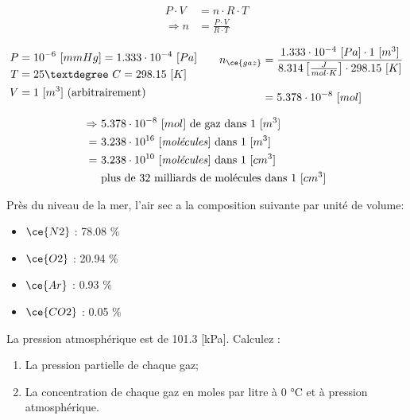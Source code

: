 \documentclass[
  11pt,
  a4paper,
  openany]{book}
\providecommand{\tightlist}{%
  \setlength{\itemsep}{0pt}\setlength{\parskip}{0pt}}
\begin{document}
\begin{Answer}
\[
\begin{split}
    P \cdot V &= n \cdot R \cdot T \\
    \Rightarrow n &= \frac{P \cdot V}{R \cdot T}
\end{split}
\]

\[
\begin{split}
    P &= 10^{-6}\ [mmHg] = 1.333 \cdot 10^{-4}\ [Pa] \\
    T &= 25°\ C = 298.15\ [K] \\
    V &= 1\ [m^3] \text{ (arbitrairement)}
\end{split}
\qquad
\begin{split}
    n_{\ce{gaz}} &= \frac{1.333 \cdot 10^{-4}\ [Pa] \cdot 1\ [m^3]}{8.314 \left[\frac{J}{mol \cdot K}\right] \cdot 298.15\ [K]} \\[1em]
    & = 5.378 \cdot 10^{-8}\ [mol]
\end{split}
\]

\[
\begin{split}
    \Rightarrow\ & 5.378 \cdot 10^{-8}\ [mol] \text{ de gaz dans 1 [$m^3$]} \\
    =\ & 3.238 \cdot 10^{16} \text{ [\textit{molécules}] dans 1 [$m^3$]} \\
    =\ & 3.238 \cdot 10^{10} \text{ [\textit{molécules}] dans 1 [$cm^3$]} \\
    & \text{plus de 32 milliards de molécules dans 1 [$cm^3$]}
\end{split}
\]

\end{Answer}

\begin{Exercise}

Près du niveau de la mer, l'air sec a la composition suivante par unité de volume:

\begin{itemize}
\tightlist
\item
  \(\ce{N2}\) : 78.08 \%
\item
  \(\ce{O2}\) : 20.94 \%
\item
  \(\ce{Ar}\) : 0.93 \%
\item
  \(\ce{CO2}\) : 0.05 \%
\end{itemize}

La pression atmosphérique est de 101.3 {[}kPa{]}. Calculez :

\begin{enumerate}
\def\labelenumi{\alph{enumi}.}
\tightlist
\item
  La pression partielle de chaque gaz;
\item
  La concentration de chaque gaz en moles par litre à 0 °C et à pression atmosphérique.
\end{enumerate}

\end{Exercise}
\end{document}
